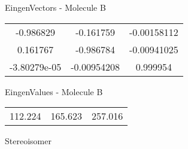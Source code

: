 \begin{multicols}{2}
\begin{center}
\vtab
 EingenVectors - Molecule B     \\
\vtab
\begin{tabular}{|c c c|}
-0.986829	 & 	-0.161759	 & 	-0.00158112	 \\
0.161767	 & 	-0.986784	 & 	-0.00941025	 \\
-3.80279e-05	 & 	-0.00954208	 & 	0.999954
\end{tabular}

\vtab
 EingenValues - Molecule B     \\
\vtab
\begin{tabular}{|c c c|}
112.224	 & 	165.623	 & 	257.016	 \\
\end{tabular}

\end{center}
\end{multicols}
\begin{center}
\vtab
\vtab
\textcolor{NavyBlue}{\Large Stereoisomer}
\end{center}

 \newpage

